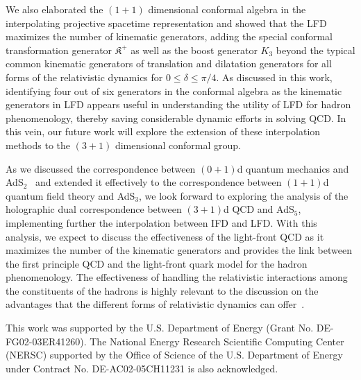\documentclass[%
 reprint,
superscriptaddress,
 amsmath,amssymb,
 aps,
]{revtex4-2}
\begin{document}
We also elaborated the $(1+1)$ dimensional conformal algebra in the interpolating projective spacetime representation and showed that the LFD maximizes the number of kinematic generators, adding the special conformal transformation  generator $\mathfrak{K}^{+}$
as well as the boost generator $K_3$ beyond the typical common kinematic generators of translation and dilatation generators for all forms of the relativistic dynamics for $0 \le \delta \le \pi/4$. 
As discussed in this work, identifying four out of six generators in the conformal algebra as the kinematic generators in LFD appears useful in understanding the utility of LFD for hadron phenomenology, thereby saving considerable dynamic efforts in solving QCD. In this vein, our future work will explore the extension of these interpolation methods to the $(3+1)$  dimensional conformal group. 

{\color{red}  As we discussed the correspondence 
 between $(0+1)$d quantum mechanics and AdS$_2$~\cite{Fubini1976} and extended it effectively to the correspondence between $(1+1)$d quantum field theory and AdS$_3$, we look forward to exploring the analysis of the holographic dual correspondence between $(3+1)$d QCD and AdS$_5$, implementing further the interpolation between IFD and LFD. With this analysis, we expect to discuss the effectiveness of the light-front QCD as it maximizes the number of the kinematic generators and provides the link between the first principle QCD and the light-front quark model for the hadron phenomenology. The effectiveness of handling the relativistic interactions among the constituents of the hadrons is highly relevant to the discussion on the advantages that the different forms of relativistic dynamics can offer~\cite{Ji2025}.  }

\acknowledgments
This work was supported by the U.S. Department of Energy (Grant No. DE-FG02-03ER41260).
The National Energy Research Scientific Computing Center (NERSC) supported by the Office of Science of the U.S. Department of Energy under Contract No. DE-AC02-05CH11231 is also acknowledged. 

\appendix
\end{document}
